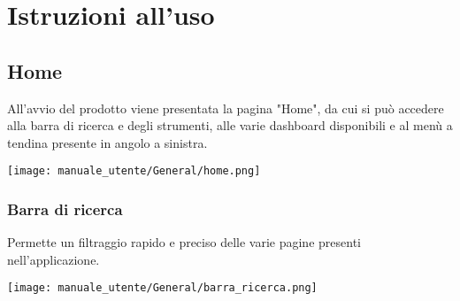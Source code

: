 \section{Istruzioni all'uso}
\subsection{Home}
All'avvio del prodotto viene presentata la pagina "Home", da cui si può accedere alla barra di ricerca e degli strumenti, alle varie dashboard disponibili e al menù a tendina presente in angolo a sinistra.
\begin{center}
    \texttt{[image: manuale\_utente/General/home.png]}
\end{center}
\newpage
\subsubsection{Barra di ricerca}
Permette un filtraggio rapido e preciso delle varie pagine presenti nell'applicazione. 
\begin{center}
    \texttt{[image: manuale\_utente/General/barra\_ricerca.png]}
\end{center}

